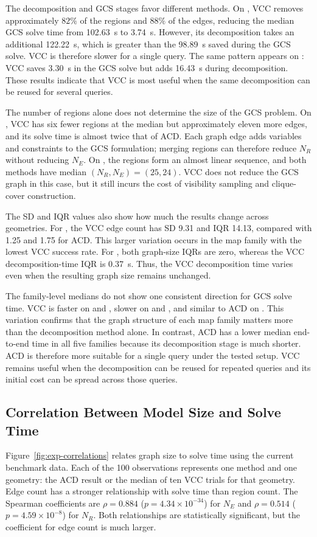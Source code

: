 The decomposition and GCS stages favor different methods. On
, VCC removes approximately $82\%$ of the regions and $88\%$
of the edges, reducing the median GCS solve time from 102.63~s to 3.74~s.
However, its decomposition takes an additional 122.22~s, which is greater than
the 98.89~s saved during the GCS solve. VCC is therefore slower for a single
query. The same pattern appears on : VCC saves 3.30~s in the GCS
solve but adds 16.43~s during decomposition. These results indicate that VCC is
most useful when the same decomposition can be reused for several queries.

The number of regions alone does not determine the size of the GCS problem.
On , VCC has six fewer regions at the median but approximately
eleven more edges, and its solve time is almost twice that of ACD. Each graph
edge adds variables and constraints to the GCS formulation; merging regions can
therefore reduce $N_R$ without reducing $N_E$. On , the regions
form an almost linear sequence, and both methods have median
$(N_R,N_E)=(25,24)$. VCC does not reduce the GCS graph in this case, but it
still incurs the cost of visibility sampling and clique-cover construction.

The SD and IQR values also show how much the results change across geometries.
For , the VCC edge count has SD 9.31 and IQR 14.13, compared with
1.25 and 1.75 for ACD. This larger variation occurs in the map family with the
lowest VCC success rate. For , both graph-size IQRs are zero,
whereas the VCC decomposition-time IQR is 0.37~s. Thus, the VCC decomposition
time varies even when the resulting graph size remains unchanged.

The family-level medians do not show one consistent direction for GCS solve
time. VCC is faster on  and , slower on
 and , and similar to ACD on .
This variation confirms that the graph structure of each map family matters
more than the decomposition method alone. In contrast, ACD has a lower median
end-to-end time in all five families because its decomposition stage is much
shorter. ACD is therefore more suitable for a single query under the tested
setup. VCC remains useful when the decomposition can be reused for repeated
queries and its initial cost can be spread across those queries.

\subsection{Correlation Between Model Size and Solve Time}
Figure~\ref{fig:exp-correlations} relates graph size to solve time using the
current benchmark data. Each of the 100 observations represents one method and
one geometry: the ACD result or the median of ten VCC trials for that geometry.
Edge count has a stronger relationship with solve time than region count. The
Spearman coefficients are $\rho=0.884$
($p=4.34\times10^{-34}$) for $N_E$ and $\rho=0.514$
($p=4.59\times10^{-8}$) for $N_R$. Both relationships are statistically
significant, but the coefficient for edge count is much larger.

